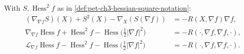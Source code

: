 \begin{theorem}
  \label{thm:pet-ch3-radial-curvature-equation}
  \leanok
  With $S,\operatorname{Hess}^2f$ as in \cref{def:pet-ch3-hessian-square-notation}:
  \begin{align}
    (\nabla_{\nabla f}S)(X)+S^2(X)-\nabla_X(S(\nabla f))&=-R(X,\nabla f)\nabla f,\\
    \nabla_{\nabla f}\operatorname{Hess}f+\operatorname{Hess}^2f-\operatorname{Hess}\Big(\tfrac12|\nabla
    f|^2\Big)&=-R(\cdot,\nabla f,\nabla f,\cdot),\\
    \mathcal L_{\nabla f}\operatorname{Hess}f-\operatorname{Hess}^2f-\operatorname{Hess}\Big(\tfrac12|\nabla
    f|^2\Big)&=-R(\cdot,\nabla f,\nabla f,\cdot).
  \end{align}
\end{theorem}
